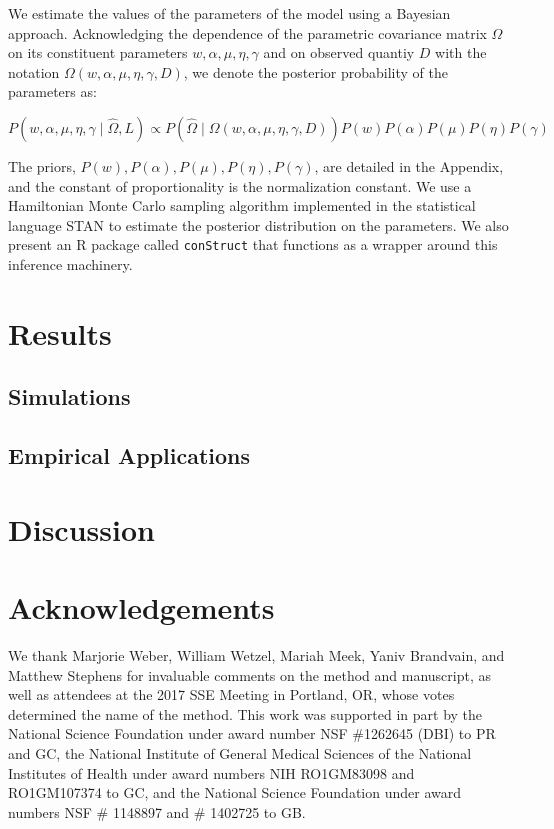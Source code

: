 \documentclass[12pt]{article}
\begin{document}
We estimate the values of the parameters of the model using a Bayesian approach.
Acknowledging the dependence of the parametric covariance matrix $\Omega$ on its constituent parameters
$w,\alpha,\mu,\eta,\gamma$ and on observed quantiy $D$ with the notation $\Omega(w,\alpha,\mu,\eta,\gamma,D)$,
we denote the posterior probability of the parameters as:

\begin{equation}
P\left( w,\alpha,\mu,\eta,\gamma \;	| \; \widehat{\Omega}, L \right) \propto
P\left(\widehat{\Omega} \; | \; \Omega(w,\alpha,\mu,\eta,\gamma,D) \right)
P(w)P(\alpha)P(\mu)P(\eta)P(\gamma)
\end{equation}

The priors, $P(w),P(\alpha),P(\mu),P(\eta),P(\gamma)$, are detailed in the Appendix,
and the constant of proportionality is the normalization constant.
We use a Hamiltonian Monte Carlo sampling algorithm implemented in the statistical language STAN
\citep{stan, NUTS, stan_lib, rstan} to estimate the posterior distribution on the parameters.
We also present an R package \citep{R} called \texttt{conStruct} that functions as a wrapper 
around this inference machinery.

\section*{Results}

\subsection*{Simulations}

\subsection*{Empirical Applications}

\section*{Discussion}

\section*{Acknowledgements}

We thank Marjorie Weber, William Wetzel, Mariah Meek, Yaniv Brandvain, and Matthew Stephens for invaluable comments on the method and manuscript, as well as attendees at the 2017 SSE Meeting in Portland, OR, whose votes determined the name of the method.
This work was supported in part by 
the National Science Foundation under award number NSF \#1262645 (DBI) to PR and GC, 
the National Institute of General Medical Sciences of the National Institutes of Health under award numbers NIH RO1GM83098 and RO1GM107374 to GC,
and the National Science Foundation under award numbers NSF \# 1148897 and \# 1402725 to GB.
\end{document}
